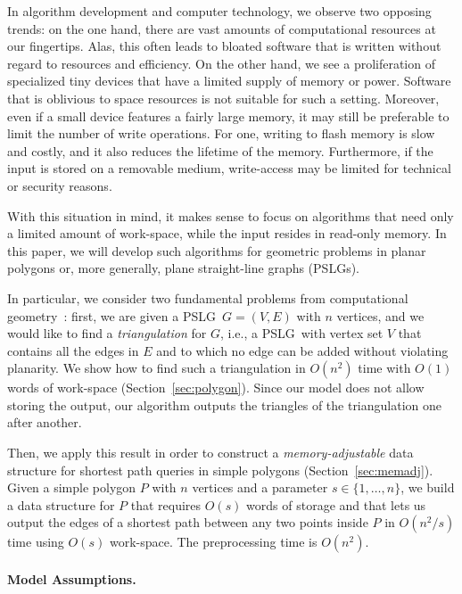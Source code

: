 \documentclass[11pt,a4paper]{article}
\newcommand{\pslg}{PSLG}
\begin{document}
In algorithm development and computer technology, we observe
two opposing trends: on the one hand, there are vast amounts
of computational resources at our fingertips.
Alas, this often leads to bloated software that is written without regard to
resources and efficiency.
On the other hand, we see a proliferation of specialized tiny  devices
that have a limited supply of memory
or power. Software that is oblivious to space
resources is not suitable for such a setting.
Moreover, even if a small device features a fairly large memory, it may still
be preferable to limit the number of write operations.
For one, writing to flash memory is
slow and costly, and it also reduces the lifetime of the memory.
Furthermore, if the input is stored on a removable medium, write-access
may be limited for technical or security reasons.

With this situation in mind, it makes sense to focus on
algorithms that need only a limited amount
of work-space, while the input resides in read-only memory.
In this paper, we will develop such algorithms for geometric
problems in planar polygons or, more generally, plane straight-line graphs
(PSLGs).

In particular, we consider two fundamental problems from computational
geometry~\cite{deBergChvKrOv08}:
first, we are given a \pslg\ $G = (V,E)$ with $n$ vertices, and
we would like to find a \emph{triangulation} for $G$, i.e., a
\pslg\ with vertex set $V$ that contains all the edges in $E$ and
to which no edge can be added without violating planarity.
We show how to find such a triangulation in $O(n^2)$ time
with $O(1)$ words of work-space (Section~\ref{sec:polygon}).
Since our model does not allow storing the output, our algorithm outputs
the triangles of the triangulation one after another.

Then,  we apply this result in order to construct
a \emph{memory-adjustable} data structure for shortest path queries
in simple polygons (Section~\ref{sec:memadj}).
Given a simple polygon $P$ with $n$ vertices and a parameter
$s \in \{1, \ldots, n\}$, we  build a data structure for $P$ that
requires $O(s)$ words of storage and that lets us output the
edges of a shortest path between any two points inside $P$ in
$O(n^2/s)$ time using $O(s)$ work-space.
The preprocessing time is $O(n^2)$.

\paragraph{Model Assumptions.}\label{sec:def}
\end{document}
